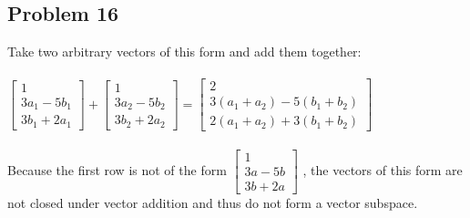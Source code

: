 \documentclass{article}%
\begin{document}
\subsection*{Problem 16}

Take two arbitrary vectors of this form and add them together:\\
\\
$
\begin{bmatrix}
    1 \\
    3a_1 - 5b_1 \\
    3b_1 + 2a_1
\end{bmatrix}
+
\begin{bmatrix}
    1 \\
    3a_2 - 5b_2 \\
    3b_2 + 2a_2
\end{bmatrix}
=
\begin{bmatrix}
    2 \\
    3(a_1 + a_2) - 5(b_1 + b_2) \\
    2(a_1 + a_2) + 3(b_1 + b_2)
\end{bmatrix}
$\\
\\
Because the first row is not of the form
$\begin{bmatrix}
    1 \\
    3a - 5b \\
    3b + 2a
\end{bmatrix}$
, the vectors of this form are not closed under vector addition and thus do not form a vector subspace.
\end{document}
